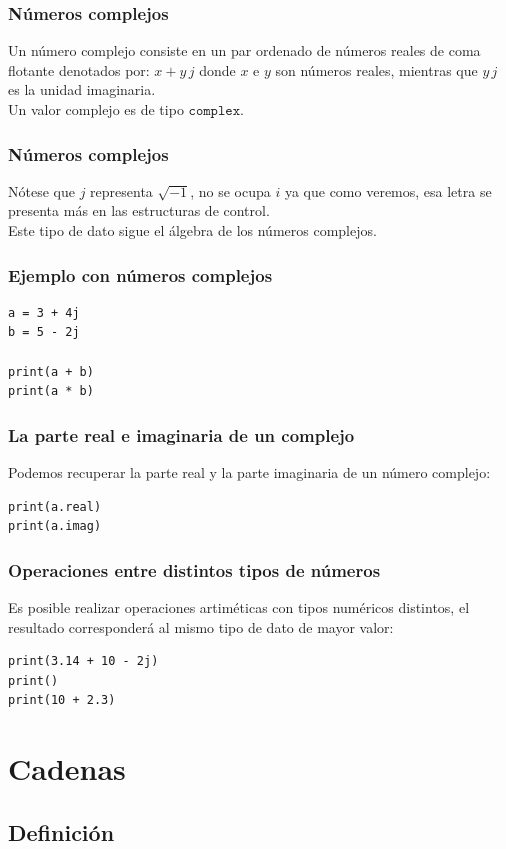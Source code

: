 \documentclass[12pt]{beamer}
\begin{document}
\begin{frame}
\frametitle{Números complejos}
Un número complejo consiste en un par ordenado de números reales de coma flotante denotados por: \pause $ x + y \, j$ donde $x$ e $y$ son números reales, \pause mientras que $y \, j$ es la unidad imaginaria.
\\
\bigskip
\pause
Un valor complejo es de tipo $\texttt{complex}$.
\end{frame}
\begin{frame}
\frametitle{Números complejos}    
Nótese que $j$ representa $\sqrt{-1}$, no se ocupa $i$ ya que como veremos, esa letra se presenta más en las estructuras de control.
\\
\bigskip
\pause
Este tipo de dato sigue el álgebra de los números complejos.
\end{frame}
\begin{frame}[fragile]
\frametitle{Ejemplo con números complejos}
\begin{lstlisting}[caption=Ejercicio con números complejos]
a = 3 + 4j
b = 5 - 2j

print(a + b)
print(a * b)
\end{lstlisting}
\end{frame}
\begin{frame}[fragile]
\frametitle{La parte real e imaginaria de un complejo}
Podemos recuperar la parte real y la parte imaginaria de un número complejo:
\pause
\begin{lstlisting}[caption=Parte real y compleja]
print(a.real)
print(a.imag)
\end{lstlisting}
\end{frame}
\begin{frame}[fragile]
\frametitle{Operaciones entre distintos tipos de números}
Es posible realizar operaciones artiméticas con tipos numéricos distintos, el resultado corresponderá al mismo tipo de dato de mayor valor:
\pause
\begin{lstlisting}[caption=Ejemplos de operaciones entre tipos de datos numéricos]
print(3.14 + 10 - 2j)
print()
print(10 + 2.3)
\end{lstlisting}
\end{frame}

\section{Cadenas}
\subsection{Definición}
\end{document}

